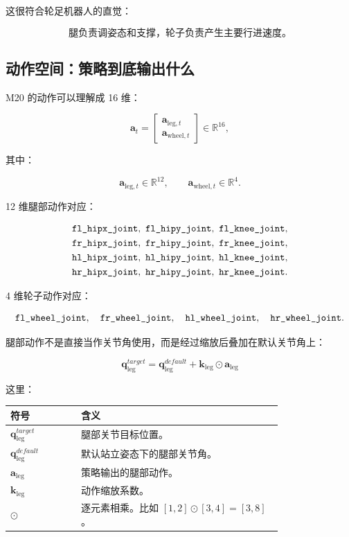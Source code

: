 \documentclass[UTF8,11pt,a4paper]{ctexart}
\newcommand{\bs}[1]{\bm{#1}}
\begin{document}
这很符合轮足机器人的直觉：

\[
\boxed{
\text{腿负责调姿态和支撑，轮子负责产生主要行进速度。}
}
\]

\subsection{动作空间：策略到底输出什么}

M20 的动作可以理解成 16 维：

\[
\bs a_t =
\begin{bmatrix}
\bs a_{\mathrm{leg},t}\\
\bs a_{\mathrm{wheel},t}
\end{bmatrix}
\in \mathbb R^{16},
\]

其中：

\[
\bs a_{\mathrm{leg},t}\in\mathbb R^{12},\qquad
\bs a_{\mathrm{wheel},t}\in\mathbb R^{4}.
\]

12 维腿部动作对应：

\[
\begin{aligned}
&\text{\texttt{fl\_hipx\_joint}},\ \text{\texttt{fl\_hipy\_joint}},\ \text{\texttt{fl\_knee\_joint}},\\
&\text{\texttt{fr\_hipx\_joint}},\ \text{\texttt{fr\_hipy\_joint}},\ \text{\texttt{fr\_knee\_joint}},\\
&\text{\texttt{hl\_hipx\_joint}},\ \text{\texttt{hl\_hipy\_joint}},\ \text{\texttt{hl\_knee\_joint}},\\
&\text{\texttt{hr\_hipx\_joint}},\ \text{\texttt{hr\_hipy\_joint}},\ \text{\texttt{hr\_knee\_joint}}.
\end{aligned}
\]

4 维轮子动作对应：

\[
\text{\texttt{fl\_wheel\_joint}},\quad
\text{\texttt{fr\_wheel\_joint}},\quad
\text{\texttt{hl\_wheel\_joint}},\quad
\text{\texttt{hr\_wheel\_joint}}.
\]

腿部动作不是直接当作关节角使用，而是经过缩放后叠加在默认关节角上：

\[
\boxed{
\bs q_{\mathrm{leg}}^{target}
=
\bs q_{\mathrm{leg}}^{default}
+
\bs k_{\mathrm{leg}}\odot \bs a_{\mathrm{leg}}
}
\]

这里：

\begin{center}
\begin{tabular}{p{0.20\linewidth}p{0.58\linewidth}}
\toprule
符号 & 含义 \\
\midrule
\(\bs q_{\mathrm{leg}}^{target}\) & 腿部关节目标位置。\\
\(\bs q_{\mathrm{leg}}^{default}\) & 默认站立姿态下的腿部关节角。\\
\(\bs a_{\mathrm{leg}}\) & 策略输出的腿部动作。\\
\(\bs k_{\mathrm{leg}}\) & 动作缩放系数。\\
\(\odot\) & 逐元素相乘。比如 \([1,2]\odot[3,4]=[3,8]\)。\\
\bottomrule
\end{tabular}
\end{center}
\end{document}
